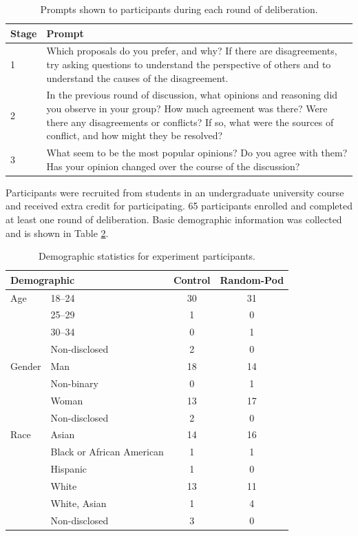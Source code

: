 \begin{table}
\center
\label{tab:prompts}
\begin{tabular}{|p{0.5in}|p{4.5in}|}
\hline
Stage & Prompt \\
\hline
1 &
Which proposals do you prefer, and why?
If there are disagreements, try asking questions to understand the perspective
of others and to understand the causes of the disagreement.
\\
\hline
2 & In the previous round of discussion, what opinions and reasoning did you
observe in your group?
How much agreement was there?
Were there any disagreements or conflicts?
If so, what were the sources of conflict, and how might they be resolved?
\\
\hline
3 &
What seem to be the most popular opinions?
Do you agree with them?
Has your opinion changed over the course of the discussion?
\\
\hline
\end{tabular}
\caption{Prompts shown to participants during each round of deliberation.}
\end{table}

Participants were recruited from students in an undergraduate university course and received extra credit for participating. 65 participants enrolled and completed at least one round of deliberation.
Basic demographic information was collected and is shown in Table \ref{tab:demographic}.

\begin{table}[]
    \centering
    \begin{tabular}{l l c c}
\hline
\multicolumn{2}{l}{Demographic} & Control & Random-Pod\\
\hline
Age & 18--24 & 30 & 31 \\
& 25--29 & 1 & 0 \\
& 30--34 & 0 & 1 \\
& Non-disclosed & 2 & 0 \\
\hline
Gender & Man & 18 & 14 \\
& Non-binary & 0 & 1 \\
& Woman & 13 & 17 \\
& Non-disclosed & 2 & 0 \\
\hline
Race & Asian & 14 & 16 \\
& Black or African American & 1 & 1 \\
& Hispanic & 1 & 0 \\
& White & 13 & 11 \\
& White, Asian & 1 & 4 \\
& Non-disclosed & 3 & 0 \\
\hline
    \end{tabular}
    \caption{Demographic statistics for experiment participants.}
    \label{tab:demographic}
\end{table}

